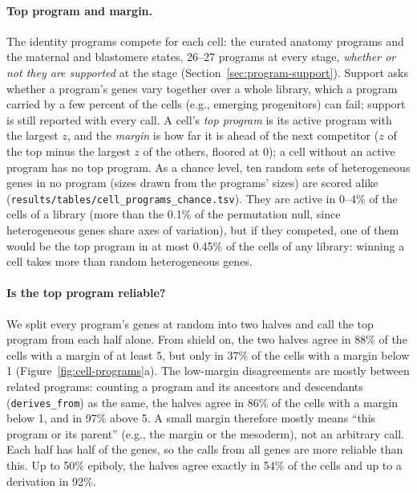 \documentclass[11pt,a4paper]{article}
\begin{document}
\paragraph{Top program and margin.} The identity programs compete for each cell: the curated anatomy programs and the maternal and blastomere states, 26--27 programs at every stage, \emph{whether or not they are supported} at the stage (Section~\ref{sec:program-support}). Support asks whether a program's genes vary together over a whole library, which a program carried by a few percent of the cells (e.g., emerging progenitors) can fail; support is still reported with every call. A cell's \emph{top program} is its active program with the largest $z$, and the \emph{margin} is how far it is ahead of the next competitor ($z$ of the top minus the largest $z$ of the others, floored at 0); a cell without an active program has no top program. As a chance level, ten random sets of heterogeneous genes in no program (sizes drawn from the programs' sizes) are scored alike (\nolinkurl{results/tables/cell_programs_chance.tsv}). They are active in 0--4\% of the cells of a library (more than the 0.1\% of the permutation null, since heterogeneous genes share axes of variation), but if they competed, one of them would be the top program in at most 0.45\% of the cells of any library: winning a cell takes more than random heterogeneous genes.

\paragraph{Is the top program reliable?} We split every program's genes at random into two halves and call the top program from each half alone. From shield on, the two halves agree in 88\% of the cells with a margin of at least 5, but only in 37\% of the cells with a margin below 1 (Figure~\ref{fig:cell-programs}a). The low-margin disagreements are mostly between related programs: counting a program and its ancestors and descendants (\texttt{derives\_from}) as the same, the halves agree in 86\% of the cells with a margin below 1, and in 97\% above 5. A small margin therefore mostly means ``this program or its parent'' (e.g., the margin or the mesoderm), not an arbitrary call. Each half has half of the genes, so the calls from all genes are more reliable than this. Up to 50\% epiboly, the halves agree exactly in 54\% of the cells and up to a derivation in 92\%.
\end{document}
